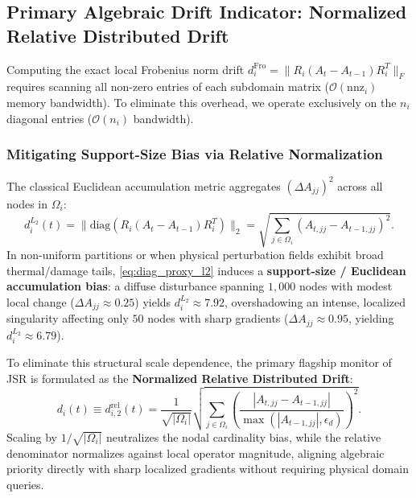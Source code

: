 \documentclass[preprint,12pt,3p]{elsarticle}
\begin{document}
\subsection{Primary Algebraic Drift Indicator: Normalized Relative Distributed Drift}
\label{subsec:diag_proxy}
Computing the exact local Frobenius norm drift $d_i^{\text{Fro}} = \|R_i (A_t - A_{t-1}) R_i^T\|_F$ requires scanning all non-zero entries of each subdomain matrix ($\mathcal{O}(\text{nnz}_i)$ memory bandwidth). To eliminate this overhead, we operate exclusively on the $n_i$ diagonal entries ($\mathcal{O}(n_i)$ bandwidth).

\subsubsection{Mitigating Support-Size Bias via Relative Normalization}
The classical Euclidean accumulation metric aggregates $(\Delta A_{jj})^2$ across all nodes in $\Omega_i$:
\begin{equation}
d_i^{L_2}(t) = \|\text{diag}(R_i (A_t - A_{t-1}) R_i^T)\|_2 = \sqrt{\sum_{j \in \Omega_i} \left( A_{t, jj} - A_{t-1, jj} \right)^2}.
\label{eq:diag_proxy_l2}
\end{equation}
In non-uniform partitions or when physical perturbation fields exhibit broad thermal/damage tails, \eqref{eq:diag_proxy_l2} induces a \textbf{support-size / Euclidean accumulation bias}: a diffuse disturbance spanning $1{,}000$ nodes with modest local change ($\Delta A_{jj} \approx 0.25$) yields $d_i^{L_2} \approx 7.92$, overshadowing an intense, localized singularity affecting only $50$ nodes with sharp gradients ($\Delta A_{jj} \approx 0.95$, yielding $d_i^{L_2} \approx 6.79$).

To eliminate this structural scale dependence, the primary flagship monitor of JSR is formulated as the \textbf{Normalized Relative Distributed Drift}:
\begin{equation}
d_i(t) \equiv d_{i, 2}^{\text{rel}}(t) = \frac{1}{\sqrt{|\Omega_i|}} \sqrt{\sum_{j \in \Omega_i} \left( \frac{|A_{t, jj} - A_{t-1, jj}|}{\max(|A_{t-1, jj}|, \epsilon_d)} \right)^2}.
\label{eq:diag_proxy_rell2}
\end{equation}
Scaling by $1/\sqrt{|\Omega_i|}$ neutralizes the nodal cardinality bias, while the relative denominator normalizes against local operator magnitude, aligning algebraic priority directly with sharp localized gradients without requiring physical domain queries.
\end{document}
